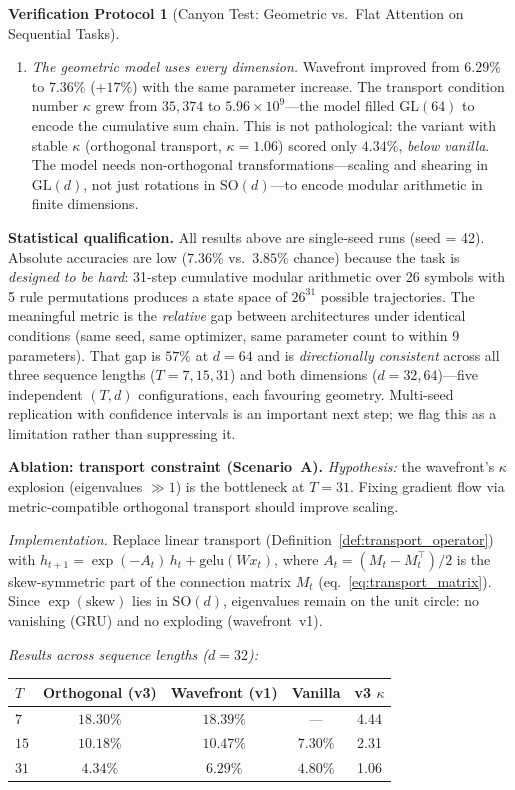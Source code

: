 \documentclass[11pt,a4paper]{article}
\theoremstyle{definition}
\newtheorem{protocol}[theorem]{Verification Protocol}
\theoremstyle{remark}
\newcommand{\SO}{\mathrm{SO}}
\begin{document}
\begin{protocol}[Canyon Test: Geometric vs.\ Flat Attention on 
Sequential Tasks]
\begin{enumerate}[nosep]
  \item \emph{The geometric model uses every dimension.} 
  Wavefront improved from $6.29\%$ to $7.36\%$ ($+17\%$) with 
  the same parameter increase. The transport condition number 
  $\kappa$ grew from $35{,}374$ to $5.96 \times 10^9$---the 
  model filled $\mathrm{GL}(64)$ to encode the cumulative sum 
  chain. This is not pathological: the variant with stable 
  $\kappa$ (orthogonal transport, $\kappa = 1.06$) scored 
  only $4.34\%$, \emph{below vanilla}. The model needs 
  non-orthogonal transformations---scaling and shearing in 
  $\mathrm{GL}(d)$, not just rotations in $\SO(d)$---to 
  encode modular arithmetic in finite dimensions.
\end{enumerate}

\noindent\textbf{Statistical qualification.}
All results above are single-seed runs (seed = 42).  Absolute 
accuracies are low ($7.36\%$ vs.\ $3.85\%$ chance) because the 
task is \emph{designed to be hard}: 31-step cumulative modular 
arithmetic over 26 symbols with 5 rule permutations produces a 
state space of $26^{31}$ possible trajectories.  The meaningful 
metric is the \emph{relative} gap between architectures under 
identical conditions (same seed, same optimizer, same parameter 
count to within 9 parameters).  That gap is $57\%$ at $d=64$ 
and is \emph{directionally consistent} across all three 
sequence lengths ($T = 7, 15, 31$) and both dimensions 
($d = 32, 64$)---five independent $(T,d)$ configurations, 
each favouring geometry.  Multi-seed replication with 
confidence intervals is an important next step; we flag this 
as a limitation rather than suppressing it.

\textbf{Ablation: transport constraint (Scenario~A).}
\emph{Hypothesis:} the wavefront's $\kappa$ explosion (eigenvalues 
$\gg 1$) is the bottleneck at $T = 31$. Fixing gradient flow via 
metric-compatible orthogonal transport should improve scaling.

\emph{Implementation.} Replace linear transport 
(Definition~\ref{def:transport_operator}) with 
$h_{t+1} = \exp(-A_t)\, h_t + \mathrm{gelu}(W x_t)$, 
where $A_t = (M_t - M_t^\top)/2$ is the skew-symmetric part of 
the connection matrix $M_t$ (eq.~\ref{eq:transport_matrix}).  Since $\exp(\text{skew})$ lies in 
$\SO(d)$, eigenvalues remain on the unit circle: no vanishing 
(GRU) and no exploding (wavefront~v1).

\emph{Results across sequence lengths ($d = 32$):}
\begin{center}
\begin{tabular}{lcccc}
\toprule
$T$ & Orthogonal (v3) & Wavefront (v1) & Vanilla & v3 $\kappa$ \\
\midrule
$7$  & $18.30\%$ & $18.39\%$ & ---      & 4.44 \\
$15$ & $10.18\%$ & $10.47\%$ & $7.30\%$ & 2.31 \\
$31$ & $4.34\%$  & $6.29\%$  & $4.80\%$ & 1.06 \\
\bottomrule
\end{tabular}
\end{center}


\end{protocol}
\end{document}
